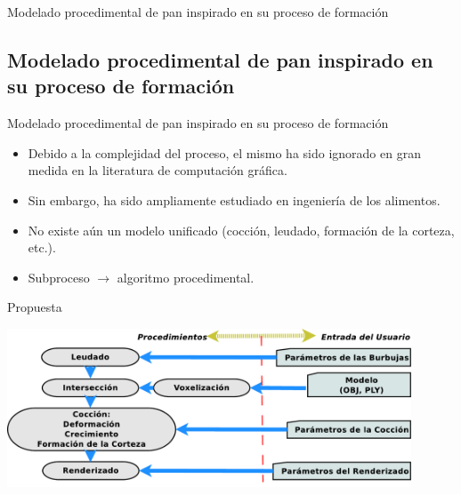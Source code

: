 \documentclass[spanish]{beamer}
\begin{document}
\begin{frame}
\begin{block}{}
\begin{center}
\vspace{1cm}
\huge{Modelado procedimental de pan inspirado en su proceso de formación}
\vspace{1cm}
\end{center}
\end{block}
\end{frame}

\subsection{Modelado procedimental de pan inspirado en su proceso de formación}
\begin{frame}{Modelado procedimental de pan inspirado en su proceso de formación}
\begin{block}{}
\begin{itemize}
\item Debido a la complejidad del proceso, el mismo ha sido ignorado en gran medida en la literatura de computación gráfica.

\item Sin embargo, ha sido ampliamente estudiado en ingeniería de los alimentos.

\item No existe aún un modelo unificado (cocción, leudado, formación de la corteza, etc.).

\item Subproceso $\rightarrow$ algoritmo procedimental.
\end{itemize}
\end{block}
\end{frame}

\begin{frame}{Propuesta}
\centerline{\includegraphics[width=12cm]{../figures/pipeline}}
\end{frame}
\end{document}
